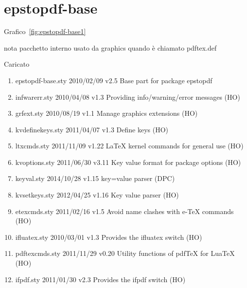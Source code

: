 \section{epstopdf-base}

Grafico~\vref{fig:epstopdf-base1}

nota pacchetto interno usato da graphics quando è chiamato pdftex.def

Caricato 
\begin{enumerate}
\item epstopdf-base.sty 2010/02/09 v2.5 Base part for package epstopdf
\item infwarerr.sty 2010/04/08 v1.3 Providing info/warning/error messages (HO)
\item grfext.sty 2010/08/19 v1.1 Manage graphics extensions (HO)
\item kvdefinekeys.sty 2011/04/07 v1.3 Define keys (HO)
\item ltxcmds.sty 2011/11/09 v1.22 LaTeX kernel commands for general use (HO)
\item kvoptions.sty 2011/06/30 v3.11 Key value format for package options (HO)
\item keyval.sty 2014/10/28 v1.15 key=value parser (DPC)
\item kvsetkeys.sty 2012/04/25 v1.16 Key value parser (HO)
\item etexcmds.sty 2011/02/16 v1.5 Avoid name clashes with e-TeX commands (HO)
\item ifluatex.sty 2010/03/01 v1.3 Provides the ifluatex switch (HO)
\item pdftexcmds.sty 2011/11/29 v0.20 Utility functions of pdfTeX for LuaTeX (HO)
\item ifpdf.sty 2011/01/30 v2.3 Provides the ifpdf switch (HO)
\end{enumerate}	
